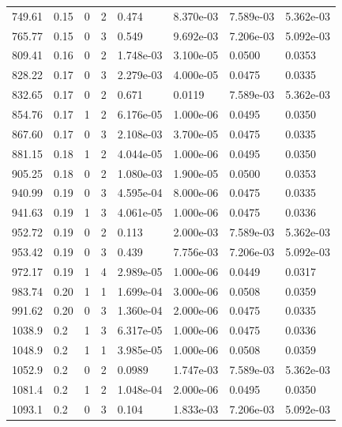 \documentclass[preview]{standalone}
\begin{document}
{{{\begin{tabular}{L{1.2cm}C{1.2cm} C{0.3cm}C{0.5cm} C{1.4cm}C{1.4cm} C{1.4cm}C{1.4cm}}
  749.61  &  0.15  & 0     &  2 &  0.474  & 8.370e-03  & 7.589e-03 &  5.362e-03   \\ 
  765.77  &  0.15  & 0     &  3 &  0.549  & 9.692e-03  & 7.206e-03 &  5.092e-03   \\ 
  809.41  &  0.16  & 0     &  2 &  1.748e-03  & 3.100e-05  & 0.0500 &  0.0353   \\ 
  828.22  &  0.17  & 0     &  3 &  2.279e-03  & 4.000e-05  & 0.0475 &  0.0335   \\ 
  832.65  &  0.17  & 0     &  2 &  0.671  & 0.0119  & 7.589e-03 &  5.362e-03   \\ 
  854.76  &  0.17  & 1     &  2 &  6.176e-05  & 1.000e-06  & 0.0495 &  0.0350   \\ 
  867.60  &  0.17  & 0     &  3 &  2.108e-03  & 3.700e-05  & 0.0475 &  0.0335   \\ 
  881.15  &  0.18  & 1     &  2 &  4.044e-05  & 1.000e-06  & 0.0495 &  0.0350   \\ 
  905.25  &  0.18  & 0     &  2 &  1.080e-03  & 1.900e-05  & 0.0500 &  0.0353   \\ 
  940.99  &  0.19  & 0     &  3 &  4.595e-04  & 8.000e-06  & 0.0475 &  0.0335   \\ 
  941.63  &  0.19  & 1     &  3 &  4.061e-05  & 1.000e-06  & 0.0475 &  0.0336   \\ 
  952.72  &  0.19  & 0     &  2 &  0.113  & 2.000e-03  & 7.589e-03 &  5.362e-03   \\ 
  953.42  &  0.19  & 0     &  3 &  0.439  & 7.756e-03  & 7.206e-03 &  5.092e-03   \\ 
  972.17  &  0.19  & 1     &  4 &  2.989e-05  & 1.000e-06  & 0.0449 &  0.0317   \\ 
  983.74  &  0.20  & 1     &  1 &  1.699e-04  & 3.000e-06  & 0.0508 &  0.0359   \\ 
  991.62  &  0.20  & 0     &  3 &  1.360e-04  & 2.000e-06  & 0.0475 &  0.0335   \\ 
  1038.9  &   0.2  & 1     &  3 &  6.317e-05  & 1.000e-06  & 0.0475 &  0.0336   \\ 
  1048.9  &   0.2  & 1     &  1 &  3.985e-05  & 1.000e-06  & 0.0508 &  0.0359   \\ 
  1052.9  &   0.2  & 0     &  2 &  0.0989  & 1.747e-03  & 7.589e-03 &  5.362e-03   \\ 
  1081.4  &   0.2  & 1     &  2 &  1.048e-04  & 2.000e-06  & 0.0495 &  0.0350   \\ 
  1093.1  &   0.2  & 0     &  3 &  0.104  & 1.833e-03  & 7.206e-03 &  5.092e-03   \\ 

\end{tabular}}}}
\end{document}

